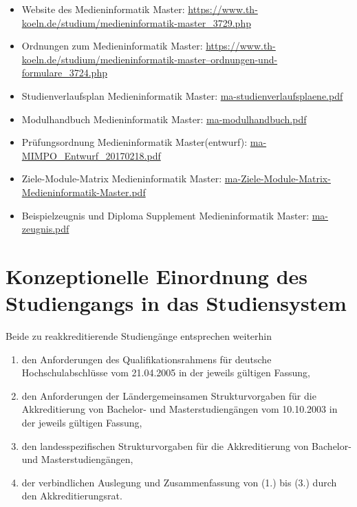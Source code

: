 \begin{itemize}
\tightlist
\item
  Website des Medieninformatik Master:
  \url{https://www.th-koeln.de/studium/medieninformatik-master\_3729.php}
\item
  Ordnungen zum Medieninformatik Master:
  \href{https://www.th-koeln.de/studium/medieninformatik-master--ordnungen-und-formulare_3724.php}{https://www.th-koeln.de/studium/medieninformatik-master--ordnungen-und-formulare\_3724.php}
\item
  Studienverlaufsplan Medieninformatik Master:
  \href{https://th-koeln.github.io/mi-2017/anhaenge/ma-studienverlaufsplaene.pdf}{ma-studienverlaufsplaene.pdf}
\item
  Modulhandbuch Medieninformatik Master:
  \href{https://th-koeln.github.io/mi-2017/anhaenge/ma-modulhandbuch.pdf}{ma-modulhandbuch.pdf}
\item
  Prüfungsordnung Medieninformatik Master(entwurf):
  \href{https://th-koeln.github.io/mi-2017/anhaenge/ma-MIMPO_Entwurf_20170218.pdf}{ma-MIMPO\_Entwurf\_20170218.pdf}
\item
  Ziele-Module-Matrix Medieninformatik Master:
  \href{https://th-koeln.github.io/mi-2017/anhaenge/ma-Ziele-Module-Matrix-Medieninformatik-Master.pdf}{ma-Ziele-Module-Matrix-Medieninformatik-Master.pdf}
\item
  Beispielzeugnis und Diploma Supplement Medieninformatik Master:
  \href{https://th-koeln.github.io/mi-2017/anhaenge/ma-zeugnis.pdf}{ma-zeugnis.pdf}
\end{itemize}

\chapter{Konzeptionelle Einordnung des Studiengangs in das
Studiensystem}\label{konzeptionelle-einordnung-des-studiengangs-in-das-studiensystem}

Beide zu reakkreditierende Studiengänge entsprechen weiterhin

\begin{enumerate}
\def\labelenumi{\arabic{enumi}.}
\item
  den Anforderungen des Qualifikationsrahmens für deutsche
  Hochschulabschlüsse vom 21.04.2005 in der jeweils gültigen Fassung,
\item
  den Anforderungen der Ländergemeinsamen Strukturvorgaben für die
  Akkreditierung von Bachelor- und Masterstudiengängen vom 10.10.2003 in
  der jeweils gültigen Fassung,
\item
  den landesspezifischen Strukturvorgaben für die Akkreditierung von
  Bachelor- und Masterstudiengängen,
\item
  der verbindlichen Auslegung und Zusammenfassung von (1.) bis (3.)
  durch den Akkreditierungsrat.
\end{enumerate}

